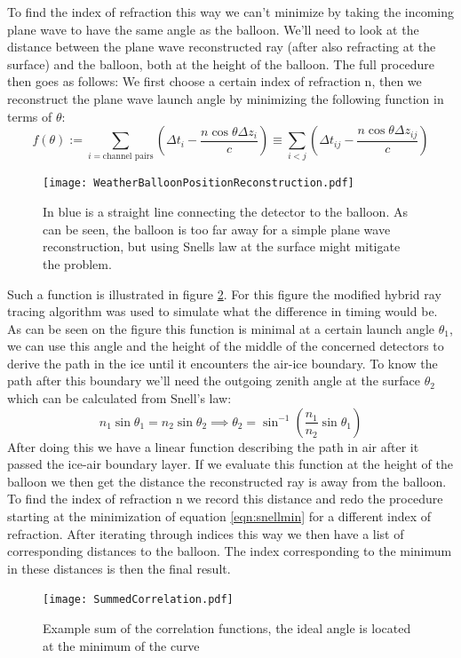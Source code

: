 To find the index of refraction this way we can't minimize by taking the
incoming plane wave to have the same angle as the balloon. We'll need to look
at the distance between the plane wave reconstructed ray (after also refracting
at the surface) and the balloon, both at the height of the balloon.  The full
procedure then goes as follows: We first choose a certain index of refraction n, 
then we reconstruct the plane wave launch angle by minimizing the following function in
terms of $\theta$:
\begin{equation}
	f(\theta) := \sum_{i=\text{channel pairs}}\left( \Delta t_i - \frac{n\cos\theta \Delta z_i}{c}\right) \equiv \sum_{i<j}\left( \Delta t_{ij} - \frac{n\cos\theta \Delta z_{ij}}{c}\right)\label{eqn:snellmin}
\end{equation}
\begin{figure}
	\centering
	\texttt{[image: WeatherBalloonPositionReconstruction.pdf]}
	\caption{In blue is a straight line connecting the detector to the
	balloon. As can be seen, the balloon is too far away for a simple plane wave
	reconstruction, but using Snells law at the surface might mitigate the
	problem.}
	\label{fig:WeatherBalloonPositionReconstruction}
\end{figure}
Such a function is illustrated in figure \ref{fig:SummedCorrelation}.  For this
figure the modified hybrid ray tracing algorithm was used to simulate what the
difference in timing would be. 
As can be seen on the figure this function is minimal at a certain launch angle
$\theta_1$, we can use this angle and the height of the middle of the concerned
detectors to derive the path in the ice until it encounters the air-ice
boundary.  To know the path after this boundary we'll need the outgoing zenith
angle at the surface $\theta_2$ which can be calculated from Snell's law:
\begin{equation}
	n_1 \sin{\theta_1} = n_2 \sin{\theta_2} \implies  \theta_2 = \sin^{-1}\left(\frac{n_1}{n_2}\sin{\theta_1}\right)
\end{equation}
After doing this we have a linear function describing the path in air after it
passed the ice-air boundary layer.  If we evaluate this function at the height
of the balloon we then get the distance the reconstructed ray is away from the
balloon.  To find the index of refraction n we record this distance and redo
the procedure starting at the minimization of equation \ref{eqn:snellmin} for a
different index of refraction. After iterating through indices this way
we then have a list of corresponding distances to the balloon. The index
corresponding to the minimum in these distances is then the final result.
\begin{figure}
	\centering
	\texttt{[image: SummedCorrelation.pdf]}
	\caption{Example sum of the correlation functions, the ideal angle is located at the minimum of the curve}
	\label{fig:SummedCorrelation}
\end{figure}
